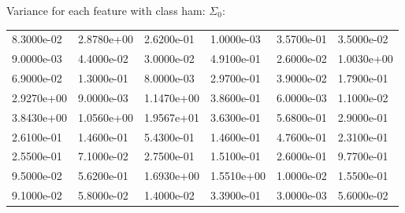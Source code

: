 \documentclass[11pt,a4paper]{article}
\begin{document}
Variance for each feature with class ham: $\Sigma_0$:

\begin{table}[!htbp]
	\begin{tabularx}{\linewidth}{|l|l|l|l|l|l|}
		\cline{1-6}
		\centering 8.3000e-02 & 2.8780e+00 & 2.6200e-01 & 1.0000e-03 & 3.5700e-01 & 3.5000e-02\\
		\cline{1-6}
		\centering 9.0000e-03 & 4.4000e-02 & 3.0000e-02 & 4.9100e-01 & 2.6000e-02 & 1.0030e+00\\
		\cline{1-6}
		\centering 6.9000e-02 & 1.3000e-01 & 8.0000e-03 & 2.9700e-01 & 3.9000e-02 & 1.7900e-01\\
		\cline{1-6}
		\centering 2.9270e+00 & 9.0000e-03 & 1.1470e+00 & 3.8600e-01 & 6.0000e-03 & 1.1000e-02\\
		\cline{1-6}
		\centering 3.8430e+00 & 1.0560e+00 & 1.9567e+01 & 3.6300e-01 & 5.6800e-01 & 2.9000e-01\\
		\cline{1-6}
		\centering 2.6100e-01 & 1.4600e-01 & 5.4300e-01 & 1.4600e-01 & 4.7600e-01 & 2.3100e-01\\
		\cline{1-6}
		\centering 2.5500e-01 & 7.1000e-02 & 2.7500e-01 & 1.5100e-01 & 2.6000e-01 & 9.7700e-01\\
		\cline{1-6}
		\centering 9.5000e-02 & 5.6200e-01 & 1.6930e+00 & 1.5510e+00 & 1.0000e-02 & 1.5500e-01\\
		\cline{1-6}
		\centering 9.1000e-02 & 5.8000e-02 & 1.4000e-02 & 3.3900e-01 & 3.0000e-03 & 5.6000e-02\\
		\cline{1-6}
	\end{tabularx}
\end{table}

\newpage
\end{document}
